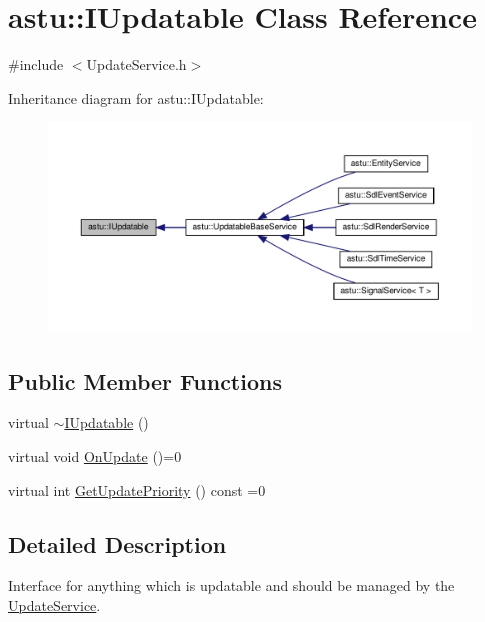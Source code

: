 \hypertarget{classastu_1_1IUpdatable}{}\section{astu\+:\+:I\+Updatable Class Reference}
\label{classastu_1_1IUpdatable}


{\ttfamily \#include $<$Update\+Service.\+h$>$}



Inheritance diagram for astu\+:\+:I\+Updatable\+:\nopagebreak
\begin{figure}[H]
\begin{center}
\leavevmode
\includegraphics[width=350pt]{classastu_1_1IUpdatable__inherit__graph}
\end{center}
\end{figure}
\subsection*{Public Member Functions}
\begin{DoxyCompactItemize}
\item 
virtual \hyperlink{classastu_1_1IUpdatable_ae0ba3ec6b901ef3dd3692471222180e6}{$\sim$\+I\+Updatable} ()
\item 
virtual void \hyperlink{classastu_1_1IUpdatable_a76c7c6e2a71b725bbdbdf6808ef4743f}{On\+Update} ()=0
\item 
virtual int \hyperlink{classastu_1_1IUpdatable_a1bf76b0fce2360b8ade25ef9ae9e3065}{Get\+Update\+Priority} () const =0
\end{DoxyCompactItemize}


\subsection{Detailed Description}
Interface for anything which is updatable and should be managed by the {\ttfamily \hyperlink{classastu_1_1UpdateService}{Update\+Service}}. 

